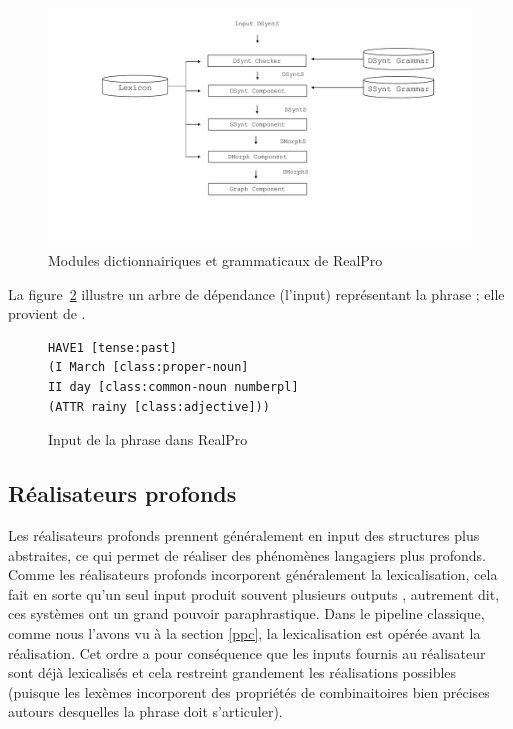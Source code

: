 \begin{figure}[htb]
	\centering
	\includegraphics[width=1\textwidth, trim = {0cm 0cm 0cm 0cm},clip]{ch2/figs/realpro.pdf}
	\caption{Modules dictionnairiques et grammaticaux de RealPro}
	\label{fig:RealPro}
\end{figure}

La figure~\ref{lst:realpro} illustre un arbre de dépendance (l'input) représentant la phrase ; elle provient de \cite{ReiterBuildingNaturalLanguage2000}.

\begin{figure}[htb]
\caption{Input de la phrase  dans RealPro}
\label{lst:realpro}
\begin{lstlisting}[language=mate]
HAVE1 [tense:past]
(I March [class:proper-noun]
II day [class:common-noun numberpl]
(ATTR rainy [class:adjective]))
\end{lstlisting}
\end{figure}


\subsection{Réalisateurs profonds}

Les réalisateurs profonds prennent généralement en input des structures plus abstraites, ce qui permet de réaliser des phénomènes langagiers plus profonds. Comme les réalisateurs profonds incorporent généralement la lexicalisation, cela fait en sorte qu'un seul input produit souvent plusieurs outputs \citep{PolguerePourmodelestratifie1998}, autrement dit, ces systèmes ont un grand pouvoir paraphrastique. Dans le pipeline classique, comme nous l'avons vu à la section \ref{ppc}, la lexicalisation est opérée avant la réalisation. Cet ordre a pour conséquence que les inputs fournis au réalisateur sont déjà lexicalisés et cela restreint grandement les réalisations possibles (puisque les lexèmes incorporent des propriétés de combinaitoires bien précises autours desquelles la phrase doit s'articuler). 

